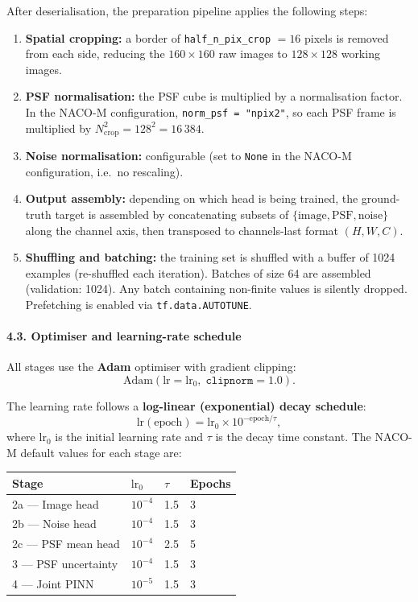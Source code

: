 \documentclass{aa}
\begin{document}
After deserialisation, the preparation pipeline applies the following steps:
\begin{enumerate}
    \item \textbf{Spatial cropping:} a border of \texttt{half\_n\_pix\_crop} $= 16$ pixels is removed from each side, reducing the $160 \times 160$ raw images to $128 \times 128$ working images.
    \item \textbf{PSF normalisation:} the PSF cube is multiplied by a normalisation factor. In the NACO-M configuration, \texttt{norm\_psf = "npix2"}, so each PSF frame is multiplied by $N_\mathrm{crop}^2 = 128^2 = 16\,384$.
    \item \textbf{Noise normalisation:} configurable (set to \texttt{None} in the NACO-M configuration, i.e.\ no rescaling).
    \item \textbf{Output assembly:} depending on which head is being trained, the ground-truth target is assembled by concatenating subsets of $\{\mathrm{image}, \mathrm{PSF}, \mathrm{noise}\}$ along the channel axis, then transposed to channels-last format $(H, W, C)$.
    \item \textbf{Shuffling and batching:} the training set is shuffled with a buffer of 1024 examples (re-shuffled each iteration). Batches of size 64 are assembled (validation: 1024). Any batch containing non-finite values is silently dropped. Prefetching is enabled via \texttt{tf.data.AUTOTUNE}.
\end{enumerate}

\paragraph{4.3. Optimiser and learning-rate schedule}

All stages use the \textbf{Adam} optimiser with gradient clipping:
\begin{equation}
\text{Adam}(\mathrm{lr} = \mathrm{lr}_0,\; \texttt{clipnorm} = 1.0).
\end{equation}

The learning rate follows a \textbf{log-linear (exponential) decay schedule}:
\begin{equation}
\mathrm{lr}(\mathrm{epoch}) = \mathrm{lr}_0 \times 10^{-\mathrm{epoch}/\tau},
\end{equation}
where $\mathrm{lr}_0$ is the initial learning rate and $\tau$ is the decay time constant. The NACO-M default values for each stage are:

\begin{table}[h]
\centering
\begin{tabular}{|l|l|l|l|}
\hline
\textbf{Stage} & $\mathrm{lr}_0$ & $\tau$ & \textbf{Epochs} \\
\hline
2a --- Image head & $10^{-4}$ & 1.5 & 3 \\
2b --- Noise head & $10^{-4}$ & 1.5 & 3 \\
2c --- PSF mean head & $10^{-4}$ & 2.5 & 5 \\
3 --- PSF uncertainty & $10^{-4}$ & 1.5 & 3 \\
4 --- Joint PINN & $10^{-5}$ & 1.5 & 3 \\
\hline
\end{tabular}
\end{table}
\end{document}
